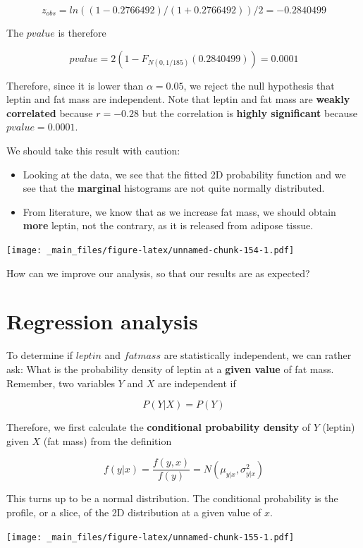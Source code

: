\documentclass[
]{book}
\begin{document}
\[z_{obs}=ln((1-0.2766492)/(1+0.2766492))/2=-0.2840499\]

The \(pvalue\) is therefore

\[pvalue=2(1- F_{N(0,1/185)}(0.2840499))=0.0001\]

Therefore, since it is lower than \(\alpha=0.05\), we reject the null hypothesis that leptin and fat mass are independent. Note that leptin and fat mass are \textbf{weakly correlated} because \(r=-0.28\) but the correlation is \textbf{highly significant} because \(pvalue=0.0001\).

We should take this result with caution:

\begin{itemize}
\item
  Looking at the data, we see that the fitted 2D probability function and we see that the \textbf{marginal} histograms are not quite normally distributed.
\item
  From literature, we know that as we increase fat mass, we should obtain \textbf{more} leptin, not the contrary, as it is released from adipose tissue.
\end{itemize}

\texttt{[image: \_main\_files/figure-latex/unnamed-chunk-154-1.pdf]}

How can we improve our analysis, so that our results are as expected?

\hypertarget{regression-analysis}{%
\section{Regression analysis}\label{regression-analysis}}

To determine if \(leptin\) and \(fatmass\) are statistically independent, we can rather ask: What is the probability density of leptin at a \textbf{given value} of fat mass. Remember, two variables \(Y\) and \(X\) are independent if

\[P(Y|X)=P(Y)\]

Therefore, we first calculate the \textbf{conditional probability density} of \(Y\) (leptin) given \(X\) (fat mass) from the definition

\[f(y|x)=\frac{f(y,x)}{f(y)}
=N(\mu_{y|x}, \sigma^2_{y|x})\]

This turns up to be a normal distribution. The conditional probability is the profile, or a slice, of the 2D distribution at a given value of \(x\).

\texttt{[image: \_main\_files/figure-latex/unnamed-chunk-155-1.pdf]}
\end{document}
